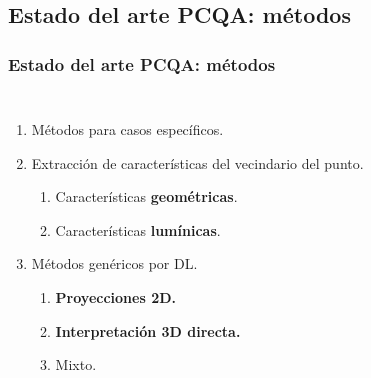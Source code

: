 \subsection{Estado del arte PCQA: métodos}
\begin{frame}
  \frametitle{Estado del arte PCQA: métodos}
  \begin{columns}
    \begin{enumerate}
      \item Métodos para casos específicos. 
      \item Extracción de características del vecindario del punto.
        \begin{enumerate}
          \item Características \textbf{geométricas}.
          \item Características \textbf{lumínicas}.
        \end{enumerate}
      \item Métodos genéricos por DL.
        \begin{enumerate}
          \item \textbf{Proyecciones 2D.}
          \item \textbf{Interpretación 3D directa.}
          \item Mixto.
        \end{enumerate}
    \end{enumerate}


\end{columns}
\end{frame}
